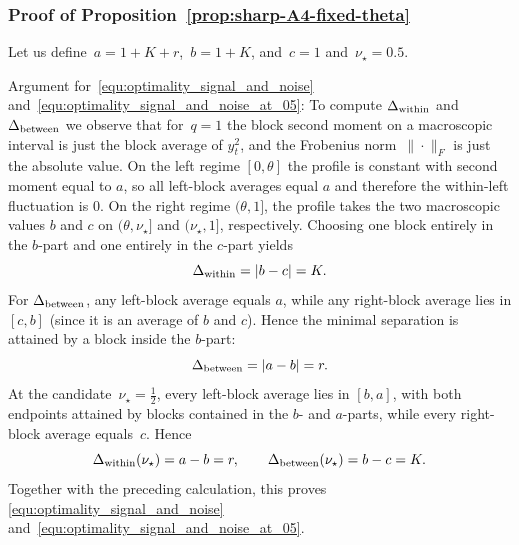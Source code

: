 \documentclass[10pt, letterpaper]{amsart}
\begin{document}
\subsubsection{Proof of Proposition~\ref{prop:sharp-A4-fixed-theta}}\label{sec:proof_optimality}
Let us define~$a= 1+ K+r$,~$b=1+K$, and~$c = 1$ and~$\nu_\star = 0.5$.\smallskip

Argument for~\eqref{equ:optimality_signal_and_noise} and~\eqref{equ:optimality_signal_and_noise_at_05}:
To compute $\Delta_{\rm within}$ and $\Delta_{\rm between}$ we observe that for~$q=1$ the block second moment on a macroscopic interval is just the block average of $y_t^2$, and the Frobenius norm~$\|\cdot\|_F$ is just the absolute value. On the left regime $[0,\theta]$ the profile is constant with second moment equal to $a$, so all left-block averages equal $a$ and therefore the within-left fluctuation is $0$.
On the right regime $(\theta,1]$, the profile takes the two macroscopic values $b$ and $c$ on
 $(\theta,\nu_\star]$ and $(\nu_\star,1]$, respectively.
Choosing one block entirely in the $b$-part and one entirely in the $c$-part yields
\[
\Delta_{\rm within}=|b-c|=K.
\]
For $\Delta_{\rm between}$, any left-block average equals $a$, while any right-block average lies in $[c,b]$
(since it is an average of $b$ and $c$). Hence the minimal separation is attained by a block inside the $b$-part:
\[
    \Delta_{\rm between}=|a-b|=r.
\]
At the candidate~$\nu_\star=\tfrac12$, every left-block average lies in
$[b,a]$, with both endpoints attained by blocks contained in the $b$- and
$a$-parts, while every right-block average equals~$c$. Hence
\[
\Delta_{\rm within}(\nu_\star)=a-b=r,
\qquad
\Delta_{\rm between}(\nu_\star)=b-c=K.
\]
Together with the preceding calculation, this proves
\eqref{equ:optimality_signal_and_noise}
and~\eqref{equ:optimality_signal_and_noise_at_05}.\smallskip
\end{document}
